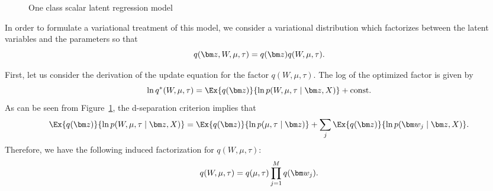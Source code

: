 \begin{figure}[t]
    \centering
    \caption{One class scalar latent regression model}\label{fig:regression_bayes_net}
\end{figure}

In order to formulate a variational treatment of this model,
we consider a variational distribution which factorizes between the latent
variables and the parameters so that
\[
    q(\vect{z}, W, \mu, \tau) = q(\vect{z})q(W, \mu, \tau).
\]

First, let us consider the derivation of the update equation for the factor $q(W, \mu, \tau)$.
The log of the optimized factor is given by
\begin{equation*}
    \ln q^*(W, \mu, \tau)
    = \Ex{q(\vect{z})}{\ln p(W, \mu, \tau \mid \vect{z}, X)} + \text{const}.
\end{equation*}
As can be seen from Figure~\ref{fig:regression_bayes_net}, the d-separation criterion implies that
\begin{equation*}
    \Ex{q(\vect{z})}{\ln p(W, \mu, \tau \mid \vect{z}, X)} =
    \Ex{q(\vect{z})}{\ln p(\mu, \tau \mid \vect{z})} +
    \sum_j \Ex{q(\vect{z})}{\ln p(\vect{w}_j \mid \vect{z}, X)}.
\end{equation*}
Therefore, we have the following induced factorization for $q(W, \mu, \tau)$:
\begin{equation*}
    q(W, \mu, \tau) =  q(\mu, \tau) \prod_{j=1}^M q(\vect{w}_j).
\end{equation*}

